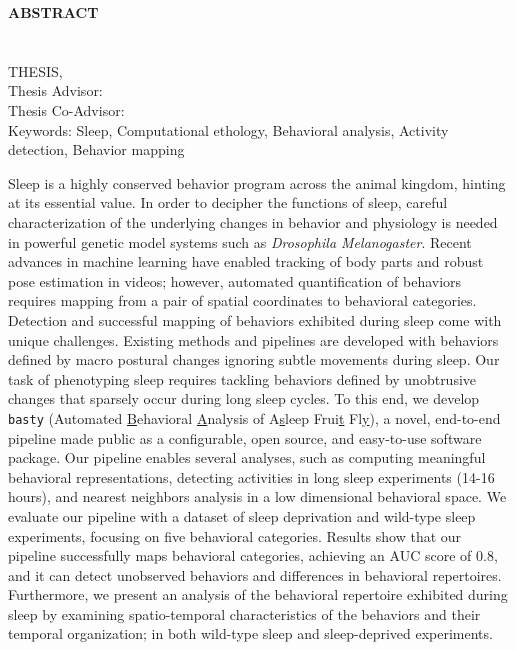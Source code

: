 \clearpage
\begin{center}
	\MakeUppercase{\textbf{Abstract}} \\ [3\baselineskip]
	\MakeUppercase{\thesistitle} \\[3\baselineskip]
	\MakeUppercase{\student} \\[\baselineskip]
	\MakeUppercase{\major \degreeabv Thesis, \month~\year} \\[\baselineskip]
	Thesis Advisor: \advisor \\
	Thesis Co-Advisor: \coadvisor \\
	[2\baselineskip]
	Keywords: Sleep, Computational ethology, Behavioral analysis, Activity detection, Behavior mapping \\[2\baselineskip]
\end{center}

\singlespacing

Sleep is a highly conserved behavior program across the animal kingdom, hinting at its essential value.
In order to decipher the functions of sleep, careful characterization of the underlying changes in behavior and physiology is needed in powerful genetic model systems such as \textit{Drosophila Melanogaster}.
Recent advances in machine learning have enabled tracking of body parts and robust pose estimation in videos; however, automated quantification of behaviors requires mapping from a pair of spatial coordinates to behavioral categories.
Detection and successful mapping of behaviors exhibited during sleep come with unique challenges.
Existing methods and pipelines are developed with behaviors defined by macro postural changes ignoring subtle movements during sleep.
Our task of phenotyping sleep requires tackling behaviors defined by unobtrusive changes that sparsely occur during long sleep cycles.
To this end, we develop \texttt{basty} (Automated \underline{B}ehavioral \underline{A}nalysis of A\underline{s}leep Frui\underline{t} Fl\underline{y}), a novel, end-to-end pipeline made public as a configurable, open source, and easy-to-use software package.
Our pipeline enables several analyses, such as computing meaningful behavioral representations, detecting activities in long sleep experiments (14-16 hours), and nearest neighbors analysis in a low dimensional behavioral space.
We evaluate our pipeline with a dataset of sleep deprivation and wild-type sleep experiments, focusing on five behavioral categories.
Results show that our pipeline successfully maps behavioral categories, achieving an AUC score of 0.8, and it can detect unobserved behaviors and differences in behavioral repertoires.
Furthermore, we present an analysis of the behavioral repertoire exhibited during sleep by examining spatio-temporal characteristics of the behaviors and their temporal organization; in both wild-type sleep and sleep-deprived experiments.

